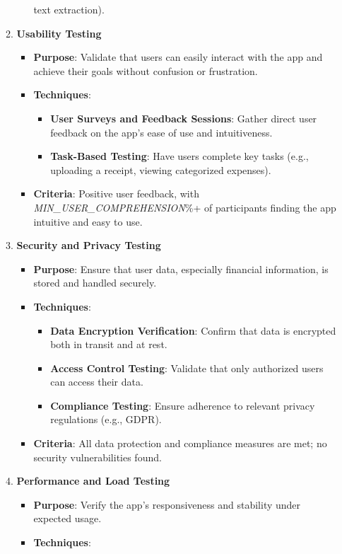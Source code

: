 \documentclass[12pt, titlepage]{article}
\begin{document}
\begin{enumerate}
\begin{enumerate}
\begin{itemize}
			text extraction).
		\end{itemize}
		\item \textbf{Usability Testing}
		\begin{itemize}
			\item \textbf{Purpose}: Validate that users can easily interact with the app and achieve their goals without confusion or frustration.
			\item \textbf{Techniques}:
			\begin{itemize}
				\item \textbf{User Surveys and Feedback Sessions}: Gather direct user feedback on the app's ease of use and intuitiveness.
				\item \textbf{Task-Based Testing}: Have users complete key tasks (e.g., uploading a receipt, viewing categorized expenses).
			\end{itemize}
			\item \textbf{Criteria}: Positive user feedback, with
			\textit{MIN\_USER\_COMPREHENSION}\%+ of participants finding the app
			intuitive and easy to use.
		\end{itemize}
		\item \textbf{Security and Privacy Testing}
		\begin{itemize}
			\item \textbf{Purpose}: Ensure that user data, especially financial information, is stored and handled securely.
			\item \textbf{Techniques}: 
			\begin{itemize}
				\item \textbf{Data Encryption Verification}: Confirm that data is encrypted both in transit and at rest.
				\item \textbf{Access Control Testing}: Validate that only authorized users can access their data.
				\item \textbf{Compliance Testing}: Ensure adherence to relevant privacy regulations (e.g., GDPR).
			\end{itemize}
			\item \textbf{Criteria}: All data protection and compliance measures are met; no security vulnerabilities found.
		\end{itemize}
		\item \textbf{Performance and Load Testing}
		\begin{itemize}
			\item \textbf{Purpose}: Verify the app's responsiveness and stability under expected usage.
			\item \textbf{Techniques}: 

\end{itemize}
\end{enumerate}
\end{enumerate}
\end{document}
